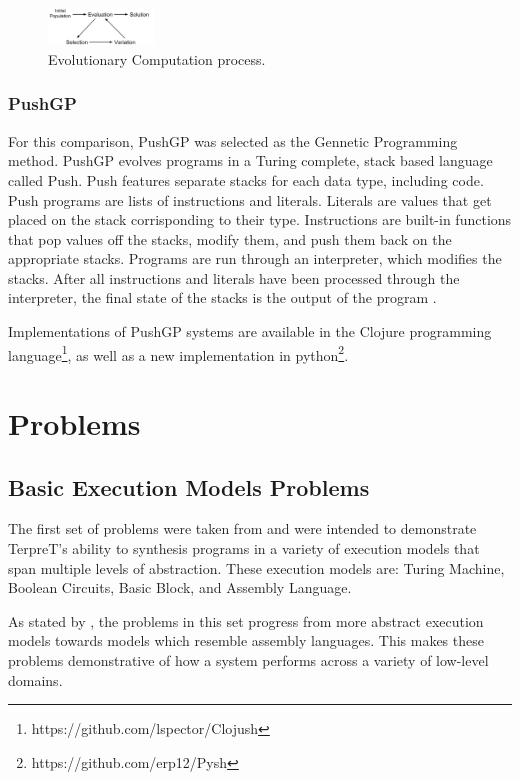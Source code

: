 \begin{figure}[t]
\centering
\includegraphics[width=0.25\textwidth]{res/EvolutionCycle}
\caption{Evolutionary Computation process.}
\label{fig:evo}
\end{figure}

\subsubsection{PushGP}

For this comparison, PushGP was selected as the Gennetic Programming method. PushGP evolves programs in a Turing complete, stack based language called Push. Push features separate stacks for each data type, including code. Push programs are lists of instructions and literals. Literals are values that get placed on the stack corrisponding to their type. Instructions are built-in functions that pop values off the stacks, modify them, and push them back on the appropriate stacks. Programs are run through an interpreter, which modifies the stacks. After all instructions and literals have been processed through the interpreter, the final state of the stacks is the output of the program \cite{Spector2002}.


Implementations of PushGP systems are available in the Clojure programming language\footnote{https://github.com/lspector/Clojush}, as well as a new implementation in python\footnote{https://github.com/erp12/Pysh}.

\section{Problems}
\subsection{Basic Execution Models Problems}
The first set of problems were taken from \cite{Gaunt2016} and were intended to demonstrate TerpreT's ability to synthesis programs in a variety of execution models that span multiple levels of abstraction. These execution models are: Turing Machine, Boolean Circuits, Basic Block, and Assembly Language. 

As stated by \cite{Gaunt2016}, the problems in this set progress from more abstract execution models towards models which resemble assembly languages. This makes these problems demonstrative of how a system performs across a variety of low-level domains. 
 
